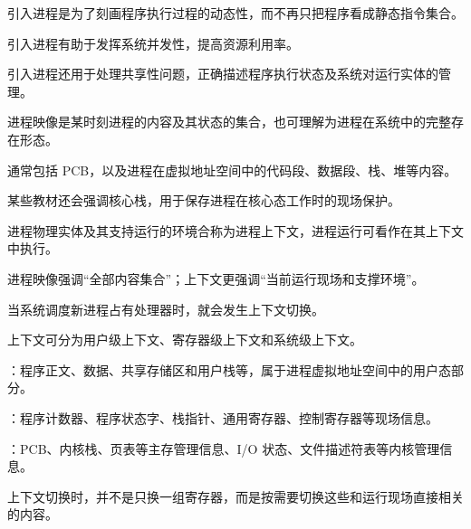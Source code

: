 \begin{points}
  \item 引入进程是为了刻画程序执行过程的动态性，而不再只把程序看成静态指令集合。
  \item 引入进程有助于发挥系统并发性，提高资源利用率。
  \item 引入进程还用于处理共享性问题，正确描述程序执行状态及系统对运行实体的管理。
\end{points}


\begin{points}
  \item 进程映像是某时刻进程的内容及其状态的集合，也可理解为进程在系统中的完整存在形态。
  \item 通常包括 PCB，以及进程在虚拟地址空间中的代码段、数据段、栈、堆等内容。
  \item 某些教材还会强调核心栈，用于保存进程在核心态工作时的现场保护。
\end{points}


\begin{points}
  \item 进程物理实体及其支持运行的环境合称为进程上下文，进程运行可看作在其上下文中执行。
  \item 进程映像强调“全部内容集合”；上下文更强调“当前运行现场和支撑环境”。
  \item 当系统调度新进程占有处理器时，就会发生上下文切换。
  \item 上下文可分为用户级上下文、寄存器级上下文和系统级上下文。
\end{points}


\begin{points}
  \item {}：程序正文、数据、共享存储区和用户栈等，属于进程虚拟地址空间中的用户态部分。
  \item {}：程序计数器、程序状态字、栈指针、通用寄存器、控制寄存器等现场信息。
  \item {}：PCB、内核栈、页表等主存管理信息、I/O 状态、文件描述符表等内核管理信息。
  \item 上下文切换时，并不是只换一组寄存器，而是按需要切换这些和运行现场直接相关的内容。
\end{points}


